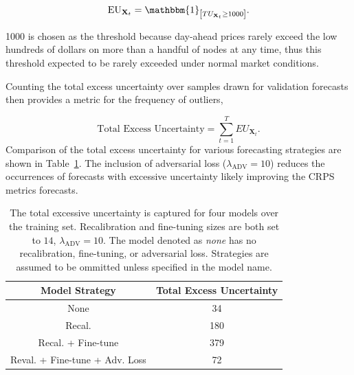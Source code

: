 \begin{equation*}
    \text{EU}_{\mathbf{X}_t} = \mathbbm{1}_{\left[ TU_{\mathbf{X}_t} \geq 1000 \right]}.
    \label{eq:excess_unc}
\end{equation*}

1000 is chosen as the threshold because day-ahead prices rarely exceed the low hundreds of dollars on more than a
handful of nodes at any time, thus this threshold expected to be rarely exceeded under normal market conditions.

Counting the total excess uncertainty over samples drawn for validation forecasts then provides a metric for the
frequency of outliers,

\begin{equation*}
    \text{Total Excess Uncertainty} = \sum_{t=1}^{T} EU_{\textbf{X}_t}.
    \label{eq:total_unc}
\end{equation*}
Comparison of the total excess uncertainty for various forecasting strategies are shown in Table~\ref{tab:total_unc}.
The inclusion of adversarial loss ($\lambda_{\text{ADV}} = 10$) reduces the occurrences of forecasts with excessive
uncertainty likely improving the CRPS metrics forecasts.

\begin{table}[htb]
    \caption[Count of forecasts with excessive uncertainty over various models]{
        The total excessive uncertainty is captured for four models over the training set.
        Recalibration and fine-tuning sizes are both set to $14$, $\lambda_{\text{ADV}} = 10$.
        The model denoted as \textit{none} has no recalibration, fine-tuning, or adversarial loss.
        Strategies are assumed to be ommitted unless specified in the model name.
    }
    \begin{center}
        \begin{tabular}{||c|c||} \hline
        Model Strategy & Total Excess Uncertainty  \\	%
        \hline \hline
        None                            & 34 \\ \hline
        Recal.                          & 180 \\ \hline
        Recal. + Fine-tune              & 379 \\ \hline
        Reval. + Fine-tune + Adv. Loss  & 72 \\ \hline
        \end{tabular}
        \\ \rule{0mm}{5mm}
    \end{center}
    \label{tab:total_unc}
\end{table}

